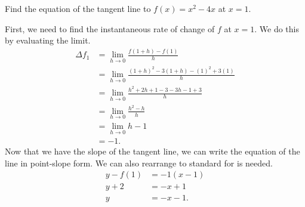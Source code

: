 \begin{example}
	Find the equation of the tangent line to $f(x)=x^2-4x$ at $x=1$.
\end{example}
First, we need to find the instantaneous rate of change of $f$ at $x=1$.
We do this by evaluating the limit.
\begin{align*}
	\Delta f_{1} &= \lim_{h \to 0}{\frac{f(1+h)-f(1)}{h}} \\
	&= \lim_{h \to 0}{\frac{(1+h)^2-3(1+h) - (1)^2 + 3(1)}{h}} \\
	&= \lim_{h \to 0}{\frac{h^2 + 2h + 1 - 3 - 3h - 1 + 3}{h}} \\
	&= \lim_{h \to 0}{\frac{h^2 - h}{h}} \\
	&= \lim_{h \to 0}{h - 1} \\
	&= -1.
\end{align*}
\indent
Now that we have the slope of the tangent line, we can write the equation of the line in point-slope form.
We can also rearrange to standard for is needed.
\begin{align*}
	y - f(1) &= -1(x - 1) \\
	y + 2 &= -x + 1 \\
	y &= -x - 1.
\end{align*}
